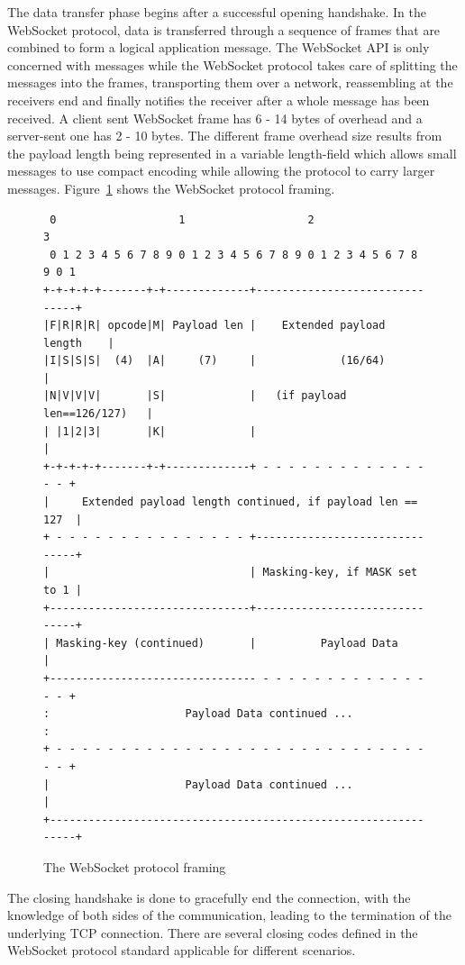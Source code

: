 \noindent
The data transfer phase begins after a successful opening handshake. In the WebSocket protocol, data is transferred through a sequence of frames that are combined to form a logical application message. The WebSocket API is only concerned with messages while the WebSocket protocol takes care of splitting the messages into the frames, transporting them over a network, reassembling at the receivers end and finally notifies the receiver after a whole message has been received. A client sent WebSocket frame has 6 - 14 bytes of overhead and a server-sent one has 2 - 10 bytes. The different frame overhead size results from the payload length being represented in a variable length-field which allows small messages to use compact encoding while allowing the protocol to carry larger messages. Figure~\ref{protocol-framing} shows the WebSocket protocol framing.
\\
\begin{figure}[h!]
\begin{verbatim}
 0                   1                   2                   3
 0 1 2 3 4 5 6 7 8 9 0 1 2 3 4 5 6 7 8 9 0 1 2 3 4 5 6 7 8 9 0 1
+-+-+-+-+-------+-+-------------+-------------------------------+
|F|R|R|R| opcode|M| Payload len |    Extended payload length    |
|I|S|S|S|  (4)  |A|     (7)     |             (16/64)           |
|N|V|V|V|       |S|             |   (if payload len==126/127)   |
| |1|2|3|       |K|             |                               |
+-+-+-+-+-------+-+-------------+ - - - - - - - - - - - - - - - +
|     Extended payload length continued, if payload len == 127  |
+ - - - - - - - - - - - - - - - +-------------------------------+
|                               | Masking-key, if MASK set to 1 |
+-------------------------------+-------------------------------+
| Masking-key (continued)       |          Payload Data         |
+-------------------------------- - - - - - - - - - - - - - - - +
:                     Payload Data continued ...                :
+ - - - - - - - - - - - - - - - - - - - - - - - - - - - - - - - +
|                     Payload Data continued ...                |
+---------------------------------------------------------------+
\end{verbatim}
\caption{The WebSocket protocol framing}
\label{protocol-framing}
\end{figure}

\noindent
The closing handshake is done to gracefully end the connection, with the knowledge of both sides of the communication, leading to the termination of the underlying TCP connection. There are several closing codes defined in the WebSocket protocol standard applicable for different scenarios.

